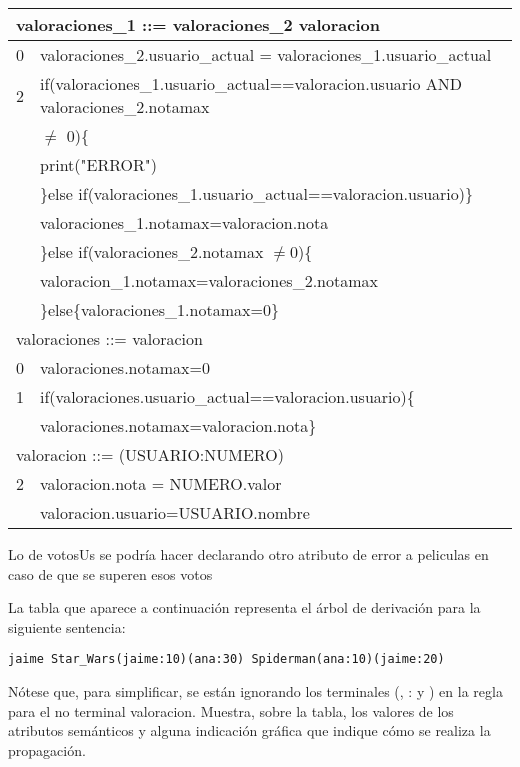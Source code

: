 \documentclass[nochap]{apuntes}
\begin{document}
\begin{problem}
\begin{tabular}{|c|l|}
\hline
\multicolumn{2}{|l|}{valoraciones\_1 ::= valoraciones\_2 valoracion} \\
\hline
0 & valoraciones\_2.usuario\_actual = valoraciones\_1.usuario\_actual\\
\hline
2 & if(valoraciones\_1.usuario\_actual==valoracion.usuario AND valoraciones\_2.notamax\\& $\neq$ 0)\{\\ &
print("ERROR")\\&
\}else if(valoraciones\_1.usuario\_actual==valoracion.usuario)\}\\&
valoraciones\_1.notamax=valoracion.nota\\&
\}else if(valoraciones\_2.notamax $\neq$0)\{\\&
valoracion\_1.notamax=valoraciones\_2.notamax\\&
\}else\{valoraciones\_1.notamax=0\}\\
\hline
\multicolumn{2}{|l|}{valoraciones ::= valoracion} \\
\hline
 0 & valoraciones.notamax=0 \\
 \hline
 1 & if(valoraciones.usuario\_actual==valoracion.usuario)\{\\ &
 valoraciones.notamax=valoracion.nota\}\\
\hline
\multicolumn{2}{|l|}{valoracion ::= (USUARIO:NUMERO)} \\
\hline
 2 & valoracion.nota = NUMERO.valor\\ & valoracion.usuario=USUARIO.nombre\\
 \hline

\end{tabular}


Lo de votosUs se podría hacer declarando otro atributo de error a peliculas en caso de que se superen esos votos
\end{problem}

\begin{problem}
La tabla que aparece a continuación representa el árbol de derivación para la siguiente sentencia:
\begin{verbatim}
jaime Star_Wars(jaime:10)(ana:30) Spiderman(ana:10)(jaime:20)
\end{verbatim}
Nótese que, para simplificar, se están ignorando los terminales (, : y ) en la regla para el no terminal valoracion. Muestra, sobre la tabla, los valores de los atributos semánticos y alguna indicación gráfica que indique cómo se realiza la propagación.
\solution
\newpage


\newpage

\end{problem}
\end{document}
